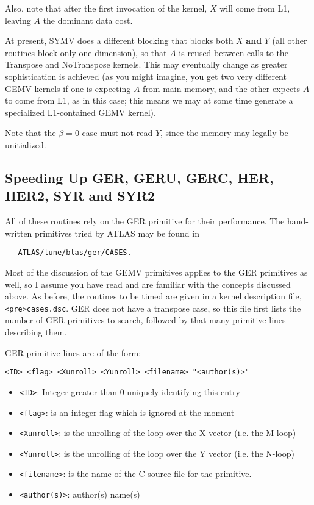 \documentclass[11pt]{article}
\begin{document}
Also, note that after the first invocation of the kernel, $X$ will come
from L1, leaving $A$ the dominant data cost.

At present, SYMV does a different blocking that blocks both $X$ {\bf and}
$Y$ (all other routines block only one dimension), so that $A$ is reused
between calls to the Transpose and NoTranspose kernels.  This may
eventually change as greater sophistication is achieved (as you might
imagine, you get two very different GEMV kernels if one is expecting
$A$ from main memory, and the other expects $A$ to come from L1, as
in this case; this means we may at some time generate a specialized
L1-contained GEMV kernel).

Note that the $\beta = 0$ case must not read $Y$, since the memory may
legally be unitialized.

\subsection{Speeding Up GER, GERU, GERC, HER, HER2, SYR and SYR2}
All of these routines rely on the GER primitive for their performance.  The
hand-written primitives tried by ATLAS may be found in
\begin{verbatim}
   ATLAS/tune/blas/ger/CASES.
\end{verbatim}

Most of the discussion of the GEMV primitives applies to the GER primitives
as well, so I assume you have read and are familiar with the concepts
discussed above.  As before, the routines to be timed are given
in a kernel description file, \verb+<pre>cases.dsc+.  GER does not have a
transpose case, so this file first lists the number of GER primitives to search,
followed by that many primitive lines describing them.

GER primitive lines are of the form:
\begin{verbatim}
<ID> <flag> <Xunroll> <Yunroll> <filename> "<author(s)>"
\end{verbatim}

\begin{itemize}
\item \verb+<ID>+: Integer greater than 0 uniquely identifying this entry
\item \verb+<flag>+: is an integer flag which is ignored at the moment
\item \verb+<Xunroll>+: is the unrolling of the loop over the X vector
      (i.e. the M-loop)
\item \verb+<Yunroll>+: is the unrolling of the loop over the Y vector
      (i.e. the N-loop)
\item \verb+<filename>+: is the name of the C source file for the primitive.
\item \verb+<author(s)>+: author(s) name(s)
\end{itemize}
\end{document}
